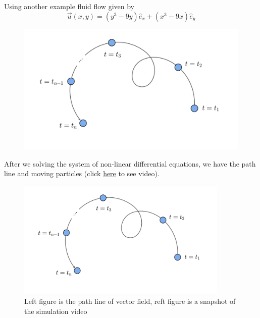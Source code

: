 \documentclass[11pt,]{beamer}
\begin{document}
\begin{frame}
	Using another example fluid flow given by
	\begin{equation}
	\vec{u}(x,y) = \left(y^3 - 9y\right) \hat{e}_x + \left(x^3 - 9x\right)\hat{e}_y
	\end{equation}
	
	\begin{figure}
    \includegraphics[page=10, width=0.8\linewidth]{imgs.pdf}
	\end{figure}

\end{frame}
\begin{frame}
	After we solving the system of non-linear differential equations, we have the path line and moving particles (click \underline{\href{https://youtube.com/shorts/bfFM8ztiRJc?si=1c8Zehqdbq2fMtKz}{here}} to see video). 
	\begin{figure}
	\includegraphics[page=11,width=0.9\textwidth]{imgs.pdf}
    \caption{Left figure is the path line of vector field, reft figure is a snapshot of the simulation video}
	\end{figure}
\end{frame}
\end{document}
